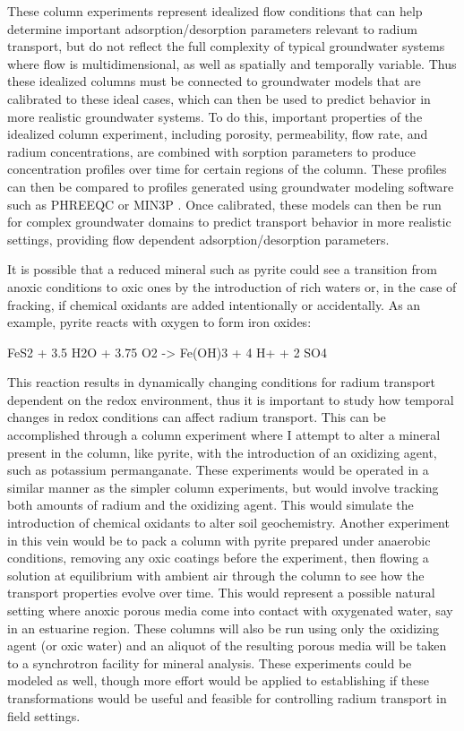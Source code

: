\documentclass[twoside,12pt,titlepage]{article}
\begin{document}
\par These column experiments represent idealized flow conditions that can help determine important adsorption/desorption parameters relevant to radium transport, but do not reflect the full complexity of typical groundwater systems where flow is multidimensional, as well as spatially and temporally variable. Thus these idealized columns must be connected to groundwater models that are calibrated to these ideal cases, which can then be used to predict behavior in more realistic groundwater systems. To do this, important properties of the idealized column experiment, including porosity, permeability, flow rate, and radium concentrations, are combined with sorption parameters to produce concentration profiles over time for certain regions of the column. These profiles can then be compared to profiles generated using groundwater modeling software such as PHREEQC \cite{PHREEQC} or MIN3P \cite{MIN3P}. Once calibrated, these models can then be run for complex groundwater domains to predict transport behavior in more realistic settings, providing flow dependent adsorption/desorption parameters.
\par It is possible that a reduced mineral such as pyrite could see a transition from anoxic conditions to oxic ones by the introduction of  rich waters or, in the case of fracking, if chemical oxidants are added intentionally or accidentally. As an example, pyrite reacts with oxygen to form iron oxides:

\begin{reaction*}
FeS2{\sld} + 3.5 H2O{\lqd} + 3.75 O2{\gas} -> Fe(OH)3{\sld} + 4 H+ + 2 SO4\mch[2]
\end{reaction*}

This reaction results in dynamically changing conditions for radium transport dependent on the redox environment, thus it is important to study how temporal changes in redox conditions can affect radium transport. This can be accomplished through a column experiment where I attempt to alter a mineral present in the column, like pyrite, with the introduction of an oxidizing agent, such as potassium permanganate. These experiments would be operated in a similar manner as the simpler column experiments, but would involve tracking both amounts of radium and the oxidizing agent. This would simulate the introduction of chemical oxidants to alter soil geochemistry. Another experiment in this vein would be to pack a column with pyrite prepared under anaerobic conditions, removing any oxic coatings before the experiment, then flowing a solution at equilibrium with ambient air through the column to see how the transport properties evolve over time. This would represent a possible natural setting where anoxic porous media come into contact with oxygenated water, say in an estuarine region. These columns will also be run using only the oxidizing agent (or oxic water) and an aliquot of the resulting porous media will be taken to a synchrotron facility for mineral analysis. These experiments could be modeled as well, though more effort would be applied to establishing if these transformations would be useful and feasible for controlling radium transport in field settings.
\end{document}
